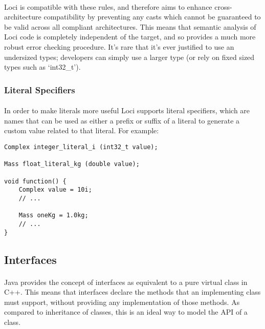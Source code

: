 \documentclass[12pt,twoside,notitlepage]{report}
\begin{document}
\paragraph{}
Loci is compatible with these rules, and therefore aims to enhance cross-architecture compatibility by preventing any casts which cannot be guaranteed to be valid across all compliant architectures. This means that semantic analysis of Loci code is completely independent of the target, and so provides a much more robust error checking procedure. It's rare that it's ever justified to use an undersized types; developers can simply use a larger type (or rely on fixed sized types such as `int32\_t').

\subsubsection{Literal Specifiers}

\paragraph{}
In order to make literals more useful Loci supports literal specifiers, which are names that can be used as either a prefix or suffix of a literal to generate a custom value related to that literal. For example:

\begin{lstlisting}
Complex integer_literal_i (int32_t value);

Mass float_literal_kg (double value);

void function() {
	Complex value = 10i;
	// ...
	
	Mass oneKg = 1.0kg;
	// ...
}
\end{lstlisting}

\clearpage

\subsection{Interfaces}

\paragraph{}
Java provides the concept of interfaces as equivalent to a pure virtual class in C++. This means that interfaces declare the methods that an implementing class must support, without providing any implementation of those methods. As compared to inheritance of classes, this is an ideal way to model the API of a class.
\end{document}
